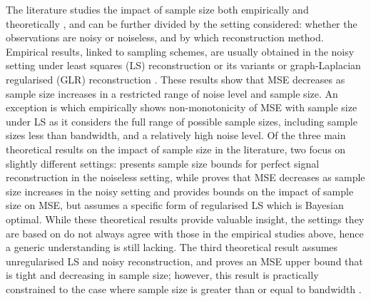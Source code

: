 The literature studies the impact of sample size both empirically and theoretically , and can be further divided by the setting considered: whether the observations are noisy or noiseless, and by which reconstruction method. Empirical results, linked to sampling schemes, are usually obtained in the noisy setting under least squares (LS) reconstruction or its variants \cite{ tremblay2017determinantal,wang2018optimal,wang2019low,chamon2017greedy} or graph-Laplacian regularised (GLR) reconstruction \cite{bai2020fast, tremblay2017determinantal}. These results show that MSE decreases as sample size increases in a restricted range of noise level and sample size. An exception is \cite[Fig. 1]{anis2016efficient} which empirically shows non-monotonicity of MSE with sample size under LS as it considers the {\color{black}full range of possible sample sizes, including sample sizes less than bandwidth,} and a relatively high noise level. Of the three main theoretical results on the impact of sample size in the literature, two focus on slightly different settings: \cite{shomorony2014sampling} presents sample size bounds for perfect signal reconstruction in the noiseless setting, while \cite[]{chamon2017greedy} proves that MSE decreases as sample size increases in the noisy setting and provides bounds on the impact of sample size on MSE, but assumes a specific form of regularised LS which is Bayesian optimal. While these theoretical results provide valuable insight, the settings they are based on do not always agree with those in the empirical studies above, hence a generic understanding is still lacking. The third theoretical result \cite[Theorem 6]{puy2018random} assumes unregularised LS and noisy reconstruction, and proves an MSE upper bound that is tight and decreasing in sample size; however, this result is practically constrained to the case where sample size is greater than or equal to bandwidth \cite[Eq. 3]{puy2018random}.

